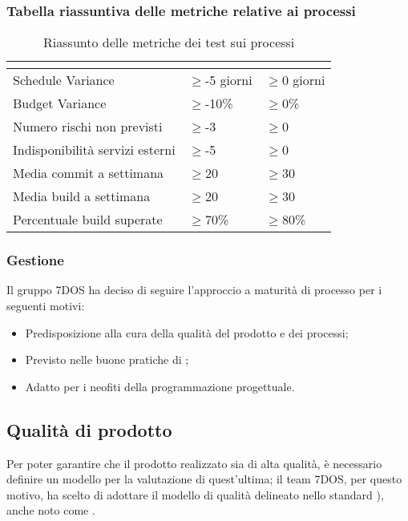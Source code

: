 \subsubsection{Tabella riassuntiva delle metriche relative ai processi}
\renewcommand{\arraystretch}{1.5}
\begin{table}[H]
	\centering
	\begin{tabular}{|C{5cm}|C{4cm}|C{4cm}|}
		\hline
		\textbf{\color{title_text}{Nome Metrica}} &  \textbf{\color{title_text}{Range accettabile}} & \textbf{\color{title_text}{Range ottimale}} \\ \hline
		Schedule Variance & $\geq$-5 giorni  & $\geq$0 giorni \\ \hline
		Budget Variance&$\geq$-10\% &$\geq$0\% \\ \hline
		Numero rischi non previsti&$\geq$-3 &$\geq$0 \\ \hline
		Indisponibilità servizi esterni&$\geq$-5 &$\geq$0 \\ \hline
		Media commit a settimana&$\geq$20 &$\geq$30 \\ \hline
		Media build a settimana&$\geq$20 &$\geq$30 \\ \hline
		Percentuale build superate& $\geq$70\% &$\geq$80\% \\ \hline

	\end{tabular}
	\caption{Riassunto delle metriche dei test sui processi}
	\label{tabella:riassunto metriche dei test sui processi}
\end{table}
\renewcommand{\arraystretch}{1}

\subsubsection{Gestione}
	Il gruppo 7DOS ha deciso di seguire l'approccio a maturità di processo per i seguenti motivi:
	\begin{itemize}
	\item Predisposizione alla cura della qualità del prodotto e dei processi;
	\item Previsto nelle buone pratiche di ;
	\item Adatto per i neofiti della programmazione progettuale.
	\end{itemize}
	
\subsection{Qualità di prodotto}
Per poter garantire che il prodotto realizzato sia di alta qualità, è necessario definire un modello per la valutazione di quest'ultima; il team 7DOS, per questo motivo, ha scelto di adottare il modello di qualità delineato nello standard ), anche noto come .

